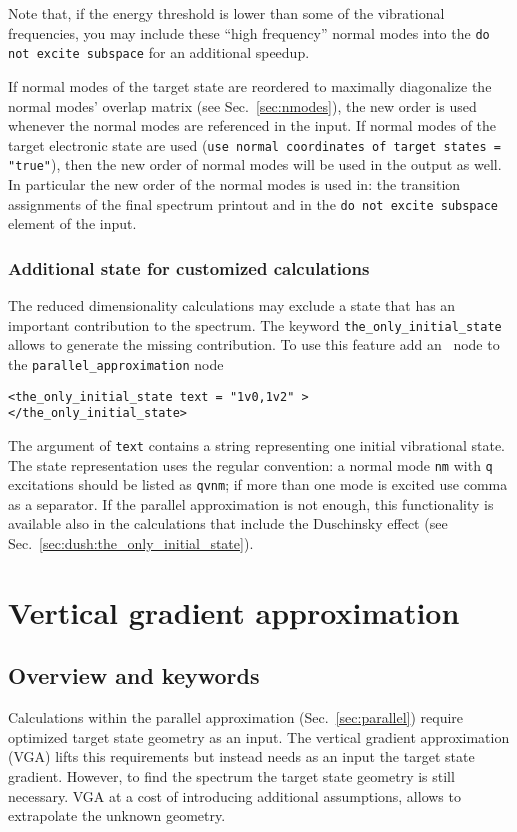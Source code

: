 \documentclass[11pt]{article}
\begin{document}
Note that, if the energy threshold is lower than some of the vibrational frequencies, 
you may include these ``high frequency'' normal modes
into the {\tt do not excite subspace} for an additional speedup.

If normal modes of the target state are reordered 
to maximally diagonalize the normal modes' overlap matrix (see Sec.~\ref{sec:nmodes}),  
the new order is used whenever the normal modes are referenced in the input.
If normal modes of the target electronic state are used ({\tt use normal coordinates of target states = "true"}),
then the new order of normal modes will be used in the output as well.
In particular the new order of the normal modes is used in:
the transition assignments of the final spectrum printout and 
in the {\tt do not excite subspace} element of the input.

\subsubsection{Additional state for customized calculations}
\label{sec:para:subspace:single_state}
The reduced dimensionality calculations may exclude a state that has an important contribution to
the spectrum. The keyword {\tt{}the\_only\_initial\_state} allows to generate the missing contribution.
To use this feature add an \xml\ node to the {\tt{}parallel\_approximation} node 
\begin{lstlisting}[frame=single,framerule=0pt]
<the_only_initial_state text = "1v0,1v2" >
</the_only_initial_state>
\end{lstlisting}
The argument of {\tt{}text} contains a string representing one initial vibrational state. The state representation uses the regular convention: a normal mode {\tt{}nm} with {\tt{}q} excitations should be listed as {\tt{}qvnm}; if more than one mode is excited use comma as a separator. If the parallel approximation is not enough, this functionality is available also in the calculations that include the Duschinsky effect (see Sec.~\ref{sec:dush:the_only_initial_state}).


\section{Vertical gradient approximation}
\label{sec:vga}

\subsection{Overview and keywords}
\label{sec:vga:overview}
Calculations within the parallel approximation (Sec.~\ref{sec:parallel})
require optimized target state geometry as an input. The vertical gradient 
approximation (VGA) lifts this requirements but instead needs as an input 
the target state gradient. 
However, to find the spectrum the target state geometry is still necessary. 
VGA at a cost of introducing additional assumptions, allows to extrapolate
the unknown geometry.
\end{document}
